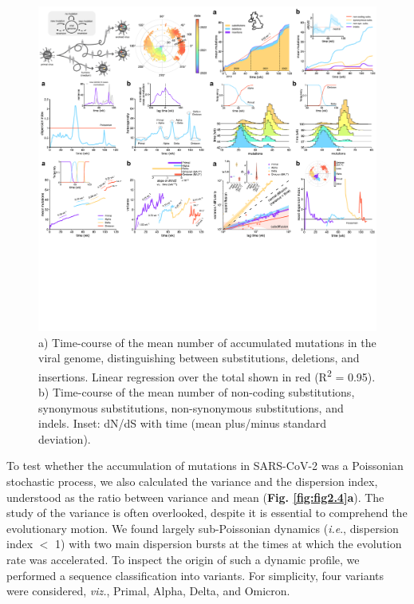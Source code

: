 \begin{figure}[ht!]
    \centering
    \includegraphics[trim={25.8cm 37cm 0 0.2cm},clip, width=\linewidth]{assets/Ch2Fig.pdf}
    \caption{a) Time-course of the mean number of accumulated mutations in the viral genome, distinguishing between substitutions, deletions, and insertions. Linear regression over the total shown in red (R\textsuperscript{2} = 0.95). b) Time-course of the mean number of non-coding substitutions, synonymous substitutions, non-synonymous substitutions, and indels. Inset: dN/dS with time (mean plus/minus standard deviation).}\label{fig:fig2.3}
\end{figure}

To test whether the accumulation of mutations in SARS-CoV-2 was a Poissonian stochastic process, we also calculated the variance and the dispersion index, understood as the ratio between variance and mean (\textbf{Fig. \ref{fig:fig2.4}a}). The study of the variance is often overlooked, despite it is essential to comprehend the evolutionary motion. We found largely sub-Poissonian dynamics (\textit{i.e}., dispersion index $<$ 1) with two main dispersion bursts at the times at which the evolution rate was accelerated. To inspect the origin of such a dynamic profile, we performed a sequence classification into variants. For simplicity, four variants were considered, \textit{viz.}, Primal, Alpha, Delta, and Omicron.

